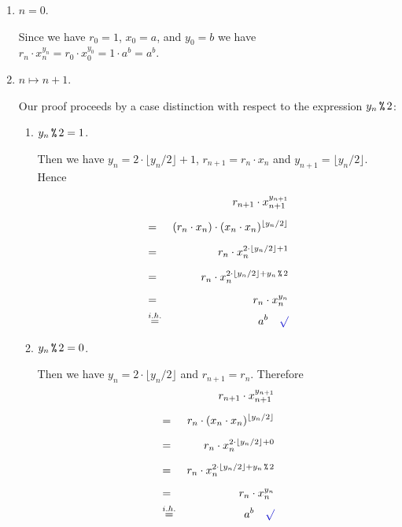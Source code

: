 \begin{enumerate}
\item[B.C.:] $n=0$.

            Since we have $r_0 = 1$, $x_0 = a$, and $y_0 = b$ we have 
            \\[0.2cm]
            \hspace*{1.3cm}
            $r_n \cdot x_n^{y_n} = r_0 \cdot x_0^{y_0} = 1 \cdot a^{b} = a^b$. \mycheck
\item[I.S.:] $n \mapsto n + 1$.

            Our proof proceeds by a case distinction with respect to the expression $y_n \,\texttt{\%}\, 2$:
            \begin{enumerate}
            \item $y_n \,\texttt{\%}\, 2 = 1$.

                  Then we have $y_{n} = 2 \cdot \lfloor y_n /  2\rfloor + 1$, 
                  $r_{n+1} = r_n \cdot x_n$ and $y_{n+1} = \lfloor y_n / 2\rfloor$.  Hence
                  
                  \begin{eqnarray*}
                      &   & r_{n+1} \cdot x_{n+1}^{y_{n+1}} \\[0.2cm] 
                      & = & (r_{n} \cdot x_n) \cdot (x_{n} \cdot x_{n})^{\lfloor y_{n}/2 \rfloor} \\[0.2cm] 
                      & = & r_{n} \cdot x_n^{2 \cdot \lfloor y_{n}/ 2\rfloor + 1} \\[0.2cm]
                      & = & r_{n} \cdot x_n^{2 \cdot \lfloor y_{n}/ 2\rfloor + y_n \mmod 2} \\[0.2cm] 
                      & = & r_{n} \cdot x_n^{y_n} \\
                      & \stackrel{i.h.}{=} & a^{b} \quad \text{\mycheck}
                  \end{eqnarray*}

            \item $y_n \,\texttt{\%}\, 2 = 0$.

                  Then we have $y_{n} = 2 \cdot \lfloor y_n / 2\rfloor$ and $r_{n+1} = r_n$.
                  Therefore
                  \begin{eqnarray*}
                      &   & r_{n+1} \cdot x_{n+1}^{y_{n+1}} \\[0.2cm] 
                      & = & r_{n} \cdot (x_{n} \cdot x_{n})^{\lfloor y_{n} / 2\rfloor} \\[0.2cm] 
                      & = & r_{n} \cdot x_n^{2 \cdot \lfloor y_{n} / 2\rfloor + 0} \\[0.2cm]
                      & = & r_{n} \cdot x_n^{2 \cdot \lfloor y_{n} / 2\rfloor + y_n \mmod 2} \\[0.2cm] 
                      & = & r_{n} \cdot x_n^{y_n} \\
                      & \stackrel{i.h.}{=} & a^{b} \quad \text{\mycheck}
                  \end{eqnarray*}
            \end{enumerate}
\end{enumerate}
